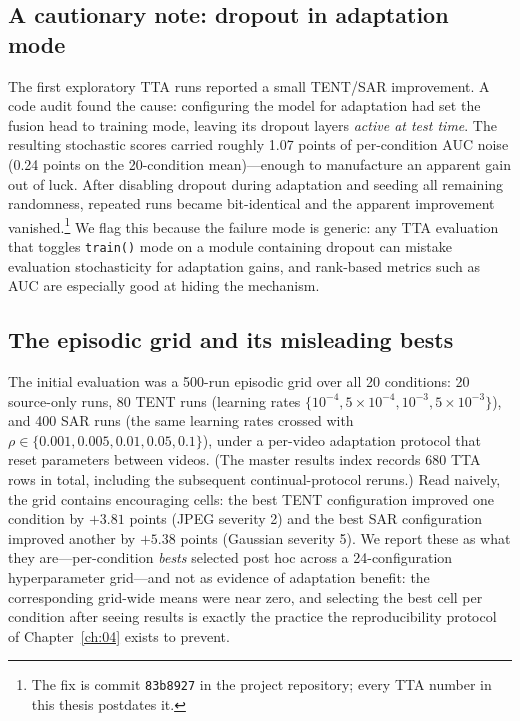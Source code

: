 \subsection{A cautionary note: dropout in adaptation mode}

The first exploratory TTA runs reported a small TENT/SAR improvement. A code
audit found the cause: configuring the model for adaptation had set the
fusion head to training mode, leaving its dropout layers \emph{active at test
time}. The resulting stochastic scores carried roughly 1.07 points of
per-condition AUC noise (0.24 points on the 20-condition mean)---enough to
manufacture an apparent gain out of luck. After disabling dropout during
adaptation and seeding all remaining randomness, repeated runs became
bit-identical and the apparent improvement vanished.\footnote{The fix is
commit \texttt{83b8927} in the project repository; every TTA number in this
thesis postdates it.} We flag this because the failure mode is generic: any
TTA evaluation that toggles \texttt{train()} mode on a module containing
dropout can mistake evaluation stochasticity for adaptation gains, and
rank-based metrics such as AUC are especially good at hiding the mechanism.

\subsection{The episodic grid and its misleading bests}

The initial evaluation was a 500-run episodic grid over all 20 conditions:
20 source-only runs, 80 TENT runs (learning rates
$\{10^{-4}, 5\times10^{-4}, 10^{-3}, 5\times10^{-3}\}$), and 400 SAR runs
(the same learning rates crossed with
$\rho \in \{0.001, 0.005, 0.01, 0.05, 0.1\}$), under a per-video adaptation
protocol that reset parameters between videos. (The master results index
records 680 TTA rows in total, including the subsequent continual-protocol
reruns.) Read naively, the grid contains encouraging cells: the best TENT
configuration improved one condition by $+3.81$ points (JPEG severity 2) and
the best SAR configuration improved another by $+5.38$ points (Gaussian
severity 5). We report these as what they are---per-condition \emph{bests}
selected post hoc across a 24-configuration hyperparameter grid---and not as
evidence of adaptation benefit: the corresponding grid-wide means were near
zero, and selecting the best cell per condition after seeing results is
exactly the practice the reproducibility protocol of Chapter~\ref{ch:04}
exists to prevent.

